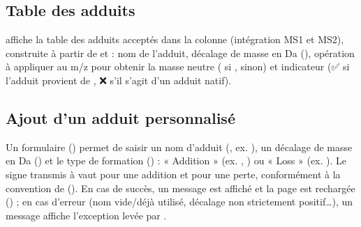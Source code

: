 \documentclass[letterpaper,10pt,english]{sphinxmanual}
\begin{document}
\subsection{Table des adduits}
\label{\detokenize{4_Resources:table-des-adduits}}
\sphinxAtStartPar
{} affiche la table des adduits acceptés dans la colonne
 (intégration MS1 et MS2), construite à partir de
 et  :
nom de l’adduit, décalage de masse en Da (), opération à
appliquer au m/z pour obtenir la masse neutre ( si
,  sinon) et indicateur 
(✅ si l’adduit provient de ,
❌ s’il s’agit d’un adduit natif).


\subsection{Ajout d’un adduit personnalisé}
\label{\detokenize{4_Resources:ajout-d-un-adduit-personnalise}}
\sphinxAtStartPar
Un formulaire () permet de saisir un nom d’adduit
(, ex. \sphinxcode{\sphinxupquote{{[}M+Cl{]}\sphinxhyphen{}}}), un décalage de masse en Da
() et le type de formation () : « Addition »
(ex. \sphinxcode{\sphinxupquote{{[}M+H{]}+}}, \sphinxcode{\sphinxupquote{{[}M+Na{]}+}}) ou « Loss » (ex. \sphinxcode{\sphinxupquote{{[}M\sphinxhyphen{}H{]}\sphinxhyphen{}}}). Le signe transmis
à  vaut  pour une addition
et  pour une perte, conformément à la convention de
{\hyperref[\detokenize{api:utils.neutral_mass.neutral_mass}]{}} (). En cas de
succès, un message  est affiché et la page est rechargée
() ; en cas d’erreur (nom vide/déjà utilisé, décalage non
strictement positif…), un message  affiche l’exception levée
par .
\end{document}
